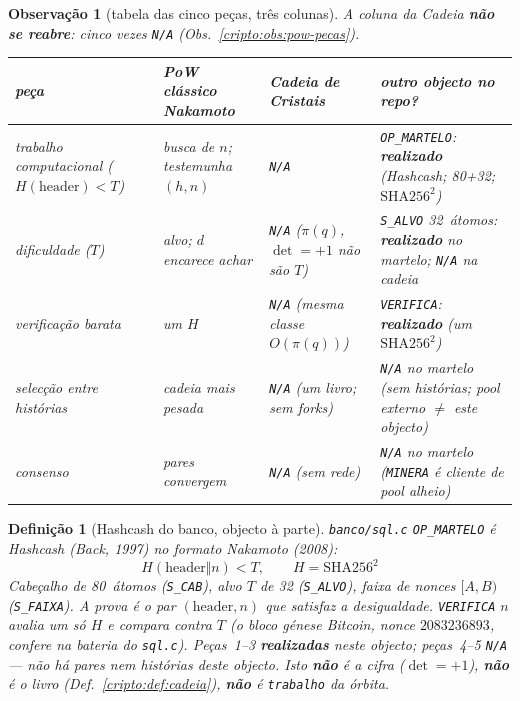 \documentclass[11pt,a4paper]{article}
\newcommand{\code}[1]{\texttt{\small #1}}
\newtheorem{definicao}[teorema]{Definição}
\newtheorem{observacao}[teorema]{Observação}
\begin{document}
\begin{observacao}[tabela das cinco peças, três colunas]\label{cripto:obs:pow-tabela}
A coluna da Cadeia \textbf{não se reabre}:
cinco vezes \texttt{N/A} (Obs.~\ref{cripto:obs:pow-pecas}).

\begin{center}\footnotesize
\begin{tabular}{@{}p{}p{}p{}p{}@{}}
\toprule
peça
  & PoW clássico Nakamoto
  & Cadeia de Cristais
  & outro objecto no repo? \\
\midrule
trabalho computacional
  ($H(\mathrm{header})<T$)
  & busca de $n$;
    testemunha $(h,n)$
  & \texttt{N/A}
  & \code{OP\_MARTELO}:
    \textbf{realizado}
    (Hashcash; 80+32;
    $\mathrm{SHA256}^{2}$) \\
dificuldade ($T$)
  & alvo; $d$ encarece achar
  & \texttt{N/A}
    ($\pi(q)$, $\det=+1$
    não são $T$)
  & \code{S\_ALVO} 32~átomos:
    \textbf{realizado} no martelo;
    \texttt{N/A} na cadeia \\
verificação barata
  & um $H$
  & \texttt{N/A}
    (mesma classe $O(\pi(q))$)
  & \code{VERIFICA}:
    \textbf{realizado}
    (um $\mathrm{SHA256}^{2}$) \\
selecção entre histórias
  & cadeia mais pesada
  & \texttt{N/A}
    (um livro; sem forks)
  & \texttt{N/A} no martelo
    (sem histórias;
    pool externo $\neq$ este objecto) \\
consenso
  & pares convergem
  & \texttt{N/A}
    (sem rede)
  & \texttt{N/A} no martelo
    (\code{MINERA} é cliente
    de pool alheio) \\
\bottomrule
\end{tabular}
\end{center}
\end{observacao}

\begin{definicao}[Hashcash do banco, objecto à parte]\label{cripto:def:martelo}
\code{banco/sql.c} \code{OP\_MARTELO} é Hashcash
(Back, 1997) no formato Nakamoto (2008):
\[
\boxed{\;
H(\mathrm{header}\Vert n)<T,\qquad
H=\mathrm{SHA256}^{2}
\;}
\]
Cabeçalho de 80~átomos (\code{S\_CAB}),
alvo $T$ de 32 (\code{S\_ALVO}),
faixa de nonces $[A,B)$ (\code{S\_FAIXA}).
A prova é o par $(\mathrm{header},n)$ que satisfaz a desigualdade.
\code{VERIFICA} $n$ avalia um só $H$ e compara contra $T$
(o bloco génese Bitcoin, nonce $2083236893$,
confere na bateria do \code{sql.c}).
Peças~1--3 \textbf{realizadas} \emph{neste} objecto;
peças~4--5 \texttt{N/A} --- não há pares nem histórias
deste objecto.
Isto \textbf{não} é a cifra ($\det=+1$),
\textbf{não} é o livro (Def.~\ref{cripto:def:cadeia}),
\textbf{não} é \texttt{trabalho} da órbita.
\end{definicao}
\end{document}
